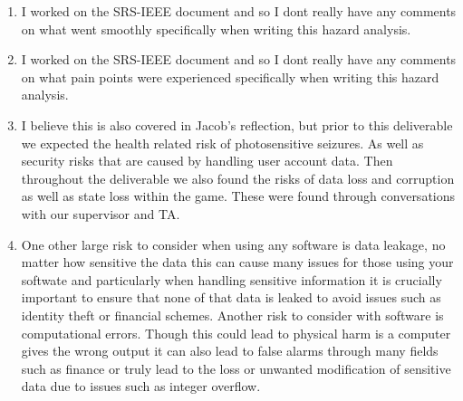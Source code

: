 \documentclass{article}
\begin{document}
\begin{enumerate}
    \item I worked on the SRS-IEEE document and so I dont really have any comments on what went smoothly specifically when
    writing this hazard analysis.
    \item I worked on the SRS-IEEE document and so I dont really have any comments on what pain points were experienced 
    specifically when writing this hazard analysis.
    \item I believe this is also covered in Jacob's reflection, but prior to this deliverable we expected 
    the health related risk of photosensitive seizures. As well as security risks that are caused by handling user account data.
    Then throughout the deliverable we also found the risks of data loss and corruption as well as state loss within the game.
    These were found through conversations with our supervisor and TA.
    \item One other large risk to consider when using any software is data leakage, no matter how sensitive the data this can 
    cause many issues for those using your softwate and particularly when handling sensitive information it is crucially important 
    to ensure that none of that data is leaked to avoid issues such as identity theft or financial schemes. Another risk to consider
    with software is computational errors. Though this could lead to physical harm is a computer gives the wrong output it can also lead
    to false alarms through many fields such as finance or truly lead to the loss or unwanted modification of sensitive data due to issues
    such as integer overflow.
\end{enumerate}
\end{document}
